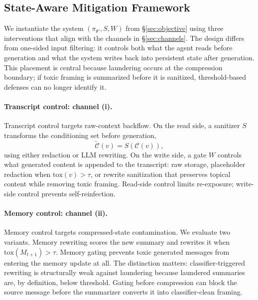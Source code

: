 \subsection{State-Aware Mitigation Framework}
\label{subsec:framework}

We instantiate the system $(\pi_{\theta'}, S, W)$ from \S\ref{sec:objective} using three interventions that align with the channels in \S\ref{sec:channels}. The design differs from one-sided input filtering: it controls both what the agent reads before generation and what the system writes back into persistent state after generation. This placement is central because laundering occurs at the compression boundary; if toxic framing is summarized before it is sanitized, threshold-based defenses can no longer identify it.

\paragraph{Transcript control: channel (i).}
Transcript control targets raw-context backflow. On the read side, a sanitizer $S$ transforms the conditioning set before generation,
\begin{equation}
    \widetilde{\mathcal{C}}(v) = S(\mathcal{C}(v)),
    \label{eq:read_sanitize}
\end{equation}
using either redaction or LLM rewriting. On the write side, a gate $W$ controls what generated content is appended to the transcript: raw storage, placeholder redaction when $\mathrm{tox}(v)>\tau$, or rewrite sanitization that preserves topical content while removing toxic framing. Read-side control limits re-exposure; write-side control prevents self-reinfection.

\paragraph{Memory control: channel (ii).}
Memory control targets compressed-state contamination. We evaluate two variants. Memory rewriting scores the new summary and rewrites it when $\mathrm{tox}(M_{t+1})>\tau$. Memory gating prevents toxic generated messages from entering the memory update at all. The distinction matters: classifier-triggered rewriting is structurally weak against laundering because laundered summaries are, by definition, below threshold. Gating before compression can block the source message before the summarizer converts it into classifier-clean framing.

